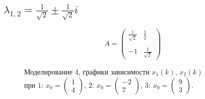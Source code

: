 \documentclass[a5paper, 10pt]{article}
\theoremstyle{definition}
\theoremstyle{plain}
\theoremstyle{remark}
\begin{document}
\subsection{$\lambda_{1, 2} = \frac{1}{\sqrt{2}} \pm \frac{1}{\sqrt{2}} i$}
\begin{equation}
A =
\begin{pmatrix}
 \frac{ 1}{\sqrt{2}} &  \frac{1}{2} \\
\\
-1 &  \frac{ 1}{\sqrt{2}}
\end{pmatrix}
\end{equation}
\begin{figure}[h!]
\caption{Моделирование 4, графики зависимости $x_1 \left( k \right), \, x_2 \left( k \right)$ \\ при  $1: \, x_0 = \begin{pmatrix} 1 \\ 4 \end{pmatrix}$, $2: \, x_0 = \begin{pmatrix} -2 \\ 7 \end{pmatrix}$, $3: \, x_0 = \begin{pmatrix} 9 \\ 3 \end{pmatrix}$.}
\end{figure}

\end{document}
